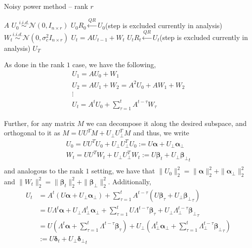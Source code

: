 \documentclass[10pt]{article}
\begin{document}
\begin{algorithm}[H]
\caption{Noisy power method -- rank $r$}\label{algo:rankr}
  \begin{algorithmic}[1]
    \REQUIRE $A$ 
    \STATE $U_0 \overset{i.i.d.}{\sim} \mathcal{N}(0, I_{n \times r})$ %
    \STATE $U_0 R_0 \overset{QR}{\leftarrow} U_0$(step is excluded currently in analysis)
    \STATE $W_t \overset{i.i.d.}{\sim} \mathcal{N}(0, \sigma_c^2 I_{n \times r})$
    \STATE $U_t = A U_{t-1} + W_t$ 
    \STATE $U_t R_t \overset{QR}{\leftarrow} U_t$(step is excluded currently in analysis)
    \ENDFOR
    \ENSURE $U_T$ 
  \end{algorithmic}
\end{algorithm}


\newcommand{\ucos}{\bm{\alpha}}
\newcommand{\usin}{\bm{\alpha}_{\perp}}

\newcommand{\wcos}{\bm{\beta}}
\newcommand{\wsin}{{\bm{\beta}_{\perp}}}

\newcommand{\utcos}{\bm{\delta}}
\newcommand{\utsin}{{\bm{\delta}_{\perp}}}


As done in the rank $1$ case, we have the following, 
\begin{gather*}
U_1 = A U_0 + W_1 \\
U_2 = A U_1 + W_2 = A^2 U_0 + A W_1 + W_2\\
\vdots \\
U_t = A^t U_0 + \sum_{\tau = 1}^t A^{t-\tau} W_\tau
\end{gather*}

Further, for any matrix $M$ we can decompose it along the desired subspace, and orthogonal to it as $M = U U^T M + U_{\perp} U_{\perp}^T M$ and thus, we write
\begin{gather*}
U_0 = U U^T U_0 + U_{\perp} U_{\perp}^T U_0 := U \ucos + U_{\perp} \usin \\
W_t = U U^T W_t + U_{\perp} U_{\perp}^T W_t := U \wcos_t + U_{\perp} \wsin_t \\
\end{gather*}
and analogous to the rank $1$ setting, we have that $\|U_0\|_2^2 = \|\ucos\|_2^2 + \|\usin\|_2^2$ and $\|W_t\|_2^2 = \|\wcos_t\|_2^2 + \|\wsin\|_2^2$. Additionally, 
\begin{align*}
U_t &= A^t (U \ucos + U_{\perp} \usin) + \sum_{\tau = 1}^t A^{t-\tau} (U \wcos_\tau + U_{\perp} \wsin_\tau) \\
&= U \Lambda^t \ucos + U_\perp \Lambda_\perp^t \usin + \sum_{\tau = 1}^t U \Lambda^{t-\tau} \wcos_\tau + U_\perp \Lambda_\perp^{t-\tau} \wsin_\tau \\
&= U\left( \Lambda^t \ucos + \sum_{\tau=1}^t \Lambda^{t-\tau} \wcos_\tau \right) + U_\perp \left( \Lambda_\perp^t \usin + \sum_{\tau=1}^t \Lambda_\perp^{t-\tau} \wsin_\tau \right) \\
&:= U \utcos_t + U_\perp \utsin_t
\end{align*}
\end{document}

